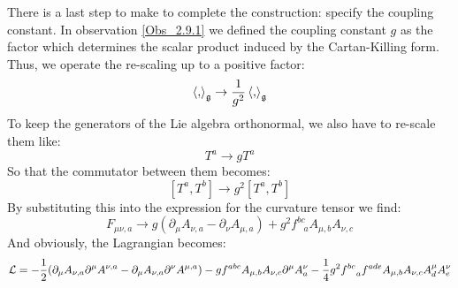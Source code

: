 \documentclass[12pt,a4paper]{report}
\theoremstyle{definition}
\theoremstyle{Theorem}
\theoremstyle{definition}
\theoremstyle{definition}
\begin{document}
	There is a last step to make to complete the construction: specify the coupling constant. In observation \ref{Obs_2.9.1} we defined the coupling constant $g$ as the factor which determines the scalar product induced by the Cartan-Killing form. Thus, we operate the re-scaling up to a positive factor:
	$$\braket{,}_\mathfrak{g}\rightarrow {1\over g^2}\braket{,}_\mathfrak{g}$$
	To keep the generators of the Lie algebra orthonormal, we also have to re-scale them like:
	$$T^a\rightarrow gT^a$$
	So that the commutator between them becomes:
	$$[T^a,T^b]\longrightarrow g^2[T^a,T^b]$$
	By substituting this into the expression for the curvature tensor we find:
	$$F_{\mu\nu,a}\rightarrow g(\partial_\mu A_{\nu,a}-\partial_\nu A_{\mu,a})+g^2 f^{bc}_{\hspace{9pt}a}A_{\mu,b}A_{\nu,c}$$
	And obviously, the Lagrangian becomes:
	$$\mathcal{L}=-{1\over 2}(\partial_\mu A_{\nu,a}\partial^\mu A^{\nu,a}-\partial_\mu A_{\nu,a}\partial^\nu A^{\mu,a})-gf^{abc}A_{\mu,b}A_{\nu,c}\partial^\mu A^{\nu}_{a}-{1\over 4}g^2 f^{bc}_{\hspace{9pt}a}f^{ade}A_{\mu,b}A_{\nu,c}A^{\mu}_dA^{\nu}_e$$
\end{document}
